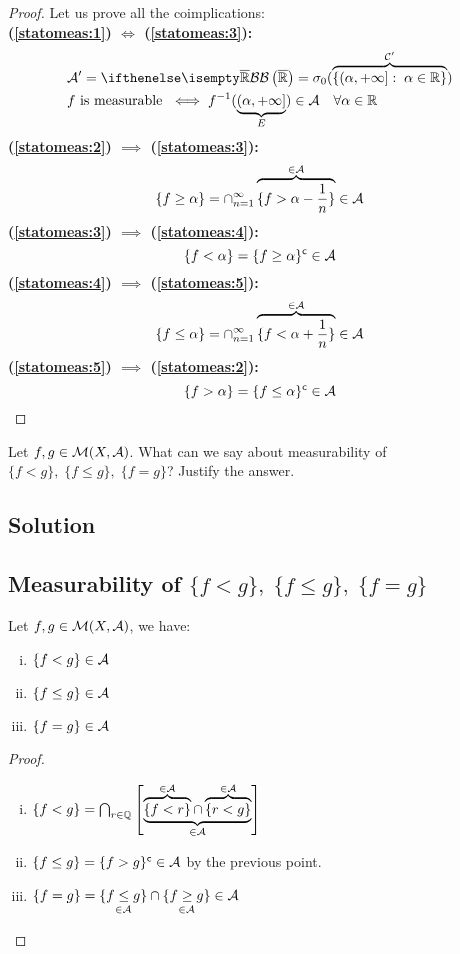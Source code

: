 \begin{proof}
    Let us prove all the coimplications:\\
    \textbf{(\ref{statomeas:1}) $\iff$ (\ref{statomeas:3}):}
    \begin{align*}
         & \A'=\B[\Rcomp]=\sigma_0( \overbrace{ \{(\alpha,+\infty]:\; \alpha\in\R\} }^{\mathcal{C}'} )                   \\
         & f \text{ is measurable } \iff f^{-1} ( \underbrace{(\alpha,+\infty]}_{E} ) \in \A \quad \forall \alpha \in \R
    \end{align*}
    \textbf{(\ref{statomeas:2}) $\implies$ (\ref{statomeas:3}):}
    \[
        \{ f\geq \alpha \} = \cap_{n=1}^\infty \overbrace{\{ f > \alpha-\frac{1}{n} \}}^{\in\mathcal{A}} \in\mathcal{A}
    \]
    \textbf{(\ref{statomeas:3}) $\implies$ (\ref{statomeas:4}):}
    \[
        \{ f<\alpha \} = \{ f\geq\alpha \}^{\mathsf{c}} \in\mathcal{A}
    \]
    \textbf{(\ref{statomeas:4}) $\implies$ (\ref{statomeas:5}):}
    \[
        \{ f \leq \alpha \} = \cap_{n=1}^\infty \overbrace{\{ f < \alpha+\frac{1}{n} \}}^{\in\mathcal{A}} \in\mathcal{A}
    \]
    \textbf{(\ref{statomeas:5}) $\implies$ (\ref{statomeas:2}):}
    \[
        \{ f>\alpha \} = \{ f\leq\alpha \}^{\mathsf{c}} \in\mathcal{A}
    \]
\end{proof}


\question

Let $f, g \in \mathcal{M}(X, \mathcal{A})$. What can we say about measurability of $\{f < g\},\; \{f \leq g\},\; \{f = g\}$? Justify the answer.

\subsection*{Solution}

\subsection{Measurability of \texorpdfstring{$\{f < g\},\; \{f \leq g\},\; \{f = g\}$}{ \{f less than g\}, \{f less or equal to g\}, \{f equal to g\}}}
Let $f, g \in \mathcal{M}(X, \mathcal{A})$, we have:
\begin{enumerate}[i)]
    \item $\{f < g\}\in\mathcal{A}$
    \item $\{f \leq g\}\in\mathcal{A}$
    \item $\{f = g\}\in\mathcal{A}$
\end{enumerate}

\begin{proof}
    \hspace*{\fill} %
    \begin{enumerate} [i)]
        \item $\{ f < g \} = \bigcap_{r\in\mathbb{Q}} \left[ \underbrace{\overbrace{\{ f < r \}}^{\in\mathcal{A}} \cap \overbrace{\{ r < g\}}^{\in\mathcal{A}}}_{\in\mathcal{A}} \right]$
        \item $ \{ f\leq g \} = \{ f > g \}^{\mathsf{c}}\in\mathcal{A}$ by the previous point.
        \item $\{f=g\} = \underset{\in\mathcal{A}}{\{ f\leq g \}} \cap \underset{\in\mathcal{A}}{\{ f\geq g \}} \in \mathcal{A}$
    \end{enumerate}
\end{proof}


